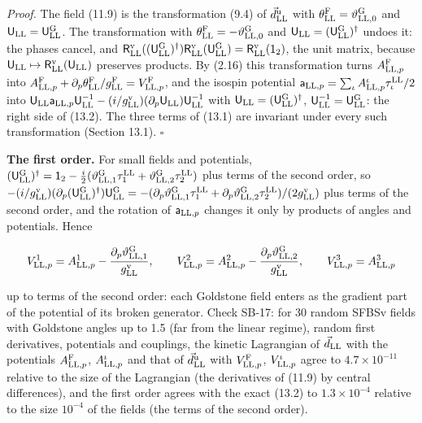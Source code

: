 \documentclass[
  10pt,
]{article}
\begin{document}
\emph{Proof.} The field (11.9) is the transformation (9.4) of
\(\vec d^{\rm u}_{\rm LL}\) with
\(\theta^{\rm F}_{\rm LL}=\vartheta^{\rm G}_{{\rm LL},0}\) and
\(\mathsf U_{\rm LL}=\mathsf U^{\rm G}_{\rm LL}\). The transformation
with \(\theta^{\rm F}_{\rm LL}=-\vartheta^{\rm G}_{{\rm LL},0}\) and
\(\mathsf U_{\rm LL}=(\mathsf U^{\rm G}_{\rm LL})^\dagger\) undoes it:
the phases cancel, and
\(\mathsf R^{\rm v}_{\rm LL}((\mathsf U^{\rm G}_{\rm LL})^\dagger)\mathsf R^{\rm v}_{\rm LL}(\mathsf U^{\rm G}_{\rm LL})=\mathsf R^{\rm v}_{\rm LL}(\mathsf 1_2)\),
the unit matrix, because
\(\mathsf U_{\rm LL}\mapsto\mathsf R^{\rm v}_{\rm LL}(\mathsf U_{\rm LL})\)
preserves products. By (2.16) this transformation turns
\(A^{\rm F}_{{\rm LL},p}\) into
\(A^{\rm F}_{{\rm LL},p}+\partial_p\theta^{\rm F}_{\rm LL}/g^{\rm F}_{\rm LL}=V^{\rm F}_{{\rm LL},p}\),
and the isospin potential
\(\mathsf a_{{\rm LL},p}=\sum_\iota A^\iota_{{\rm LL},p}\tau^{\rm LL}_\iota/2\)
into
\(\mathsf U_{\rm LL}\mathsf a_{{\rm LL},p}\mathsf U^{-1}_{\rm LL}-(i/g^{\rm v}_{\rm LL})(\partial_p\mathsf U_{\rm LL})\mathsf U^{-1}_{\rm LL}\)
with \(\mathsf U_{\rm LL}=(\mathsf U^{\rm G}_{\rm LL})^\dagger\),
\(\mathsf U^{-1}_{\rm LL}=\mathsf U^{\rm G}_{\rm LL}\): the right side
of (13.2). The three terms of (13.1) are invariant under every such
transformation (Section 13.1). \(\square\)

\textbf{The first order.} For small fields and potentials,
\((\mathsf U^{\rm G}_{\rm LL})^\dagger=\mathsf 1_2-\tfrac i2(\vartheta^{\rm G}_{{\rm LL},1}\tau^{\rm LL}_1+\vartheta^{\rm G}_{{\rm LL},2}\tau^{\rm LL}_2)\)
plus terms of the second order, so
\(-(i/g^{\rm v}_{\rm LL})(\partial_p(\mathsf U^{\rm G}_{\rm LL})^\dagger)\mathsf U^{\rm G}_{\rm LL}=-(\partial_p\vartheta^{\rm G}_{{\rm LL},1}\tau^{\rm LL}_1+\partial_p\vartheta^{\rm G}_{{\rm LL},2}\tau^{\rm LL}_2)/(2g^{\rm v}_{\rm LL})\)
plus terms of the second order, and the rotation of
\(\mathsf a_{{\rm LL},p}\) changes it only by products of angles and
potentials. Hence

\[V^1_{{\rm LL},p}=A^1_{{\rm LL},p}-\frac{\partial_p\vartheta^{\rm G}_{{\rm LL},1}}{g^{\rm v}_{\rm LL}},\qquad V^2_{{\rm LL},p}=A^2_{{\rm LL},p}-\frac{\partial_p\vartheta^{\rm G}_{{\rm LL},2}}{g^{\rm v}_{\rm LL}},\qquad V^3_{{\rm LL},p}=A^3_{{\rm LL},p}\]

up to terms of the second order: each Goldstone field enters as the
gradient part of the potential of its broken generator. Check SB-17: for
30 random SFBSv fields with Goldstone angles up to 1.5 (far from the
linear regime), random first derivatives, potentials and couplings, the
kinetic Lagrangian of \(\vec d_{\rm LL}\) with the potentials
\(A^{\rm F}_{{\rm LL},p}\), \(A^\iota_{{\rm LL},p}\) and that of
\(\vec d^{\rm u}_{\rm LL}\) with \(V^{\rm F}_{{\rm LL},p}\),
\(V^\iota_{{\rm LL},p}\) agree to \(4.7\times10^{-11}\) relative to the
size of the Lagrangian (the derivatives of (11.9) by central
differences), and the first order agrees with the exact (13.2) to
\(1.3\times10^{-4}\) relative to the size \(10^{-4}\) of the fields (the
terms of the second order).
\end{document}
